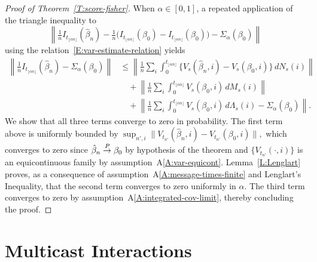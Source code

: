 \documentclass[final]{statsoc}
\begin{document}
\begin{proof}[Proof of Theorem~\ref{T:score-fisher}]
When $\alpha \in [0, 1]$, a repeated application of the triangle
inequality to
\[
    \left\|
        \tfrac{1}{n} I_{t_{\lfloor \alpha n \rfloor}}(\hat \beta_n)
        -
        \tfrac{1}{n} \big(
            I_{t_{\lfloor \alpha n \rfloor}}(\beta_0)
            -
            I_{t_{\lfloor \alpha n \rfloor}}(\beta_0)
        \big)
        -
        \Sigma_{\alpha} (\beta_0)
    \right\|
\]
using the relation~\eqref{E:var-estimate-relation} yields
\begin{align*}
    \left\|
        \tfrac{1}{n} I_{t_{\lfloor \alpha n \rfloor}}(\hat \beta_n)
        -
        \Sigma_{\alpha} (\beta_0)
    \right\|
        &\leq
        \left\|
            \frac{1}{n}
            \sum_i
            \int_0^{t_{\lfloor \alpha n \rfloor}}
                \{
                    V_s(\hat \beta_n, i)
                    -
                    V_s(\beta_0, i)
                \} \, dN_s(i)
        \right\| \\
        &\quad+
        \left\|
            \frac{1}{n}
            \sum_i
            \int_0^{t_{\lfloor \alpha n \rfloor}}
                V_s(\beta_0, i) \, dM_s(i)
        \right\| \\
        &\quad+
        \left\|
            \frac{1}{n}
            \sum_i
            \int_0^{t_{\lfloor \alpha n \rfloor}}
                V_s(\beta_0,i)
                \, d\Lambda_s(i)
            -
            \Sigma_{\alpha}(\beta_0)
        \right\|.
\end{align*}
We show that all three terms converge to zero in probability.
The first term above is uniformly bounded by
\(
    \sup_{n',i}
        \|
            V_{t_{n'}}(\hat \beta_n, i)
            -
            V_{t_{n'}}(\beta_0, i)
        \|,
\)
which converges to zero since $\hat \beta_n \overset{\mathit{P}}{\to} \beta_0$ by
hypothesis of the theorem and $\{ V_{t_{n'}}(\cdot, i) \}$ is an
equicontinuous family by assumption~A\ref{A:var-equicont}.
Lemma~\ref{L:Lenglart} proves, as a consequence of
assumption~A\ref{A:message-times-finite} and Lenglart's \citeyearpar{lenglart1977relation}
Inequality, that the second term converges
to zero uniformly in $\alpha$.
The third term converges to zero by
assumption~A\ref{A:integrated-cov-limit}, thereby concluding the proof.

\end{proof}


\section{Multicast Interactions}\label{S:multiple-receivers}
\end{document}
